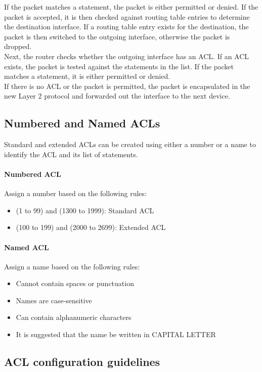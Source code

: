 If the packet matches a statement, the packet is either permitted or denied. If the packet is accepted, it is then checked against routing table entries to determine the destination interface. If a routing table entry exists for the destination, the packet is then switched to the outgoing interface, otherwise the packet is dropped. \\

Next, the router checks whether the outgoing interface has an ACL. If an ACL exists, the packet is tested against the statements in the list. If the packet matches a statement, it is either permitted or denied. \\

If there is no ACL or the packet is permitted, the packet is encapsulated in the new Layer 2 protocol and forwarded out the interface to the next device.

\subsection{Numbered and Named ACLs}

Standard and extended ACLs can be created using either a number or a name to identify the ACL and its list of statements.

\paragraph{Numbered ACL} Assign a number based on the following rules:
\begin{itemize}
\item (1 to 99) and (1300 to 1999): Standard ACL
\item (100 to 199) and (2000 to 2699): Extended ACL
\end{itemize}

\paragraph{Named ACL} Assign a name based on the following rules:
\begin{itemize}
\item Cannot contain spaces or punctuation
\item Names are case-sensitive
\item Can contain alphanumeric characters
\item It is suggested that the name be written in CAPITAL LETTER
\end{itemize}

\subsection{ACL configuration guidelines}

